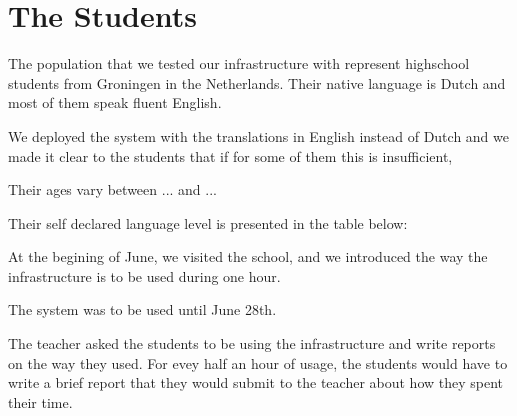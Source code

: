 
\newpage
\section{The Students}

The population that we tested our infrastructure with represent \stcnt highschool students from Groningen in the Netherlands. Their native language is Dutch and most of them speak fluent English. 

We deployed the system with the translations in English instead of Dutch and we made it clear to the students that if for some of them this is insufficient, 

Their ages vary between ... and ... 

Their self declared language level is presented in the table below: 

At the begining of June, we visited the school, and we introduced the
way the infrastructure is to be used during one hour. 

The system was to be used until June 28th. 

The teacher asked the students to be using the infrastructure and write reports on the way they used. For evey half an hour of usage, the students would have to write a brief report that they would submit to the teacher about how they spent their time.

